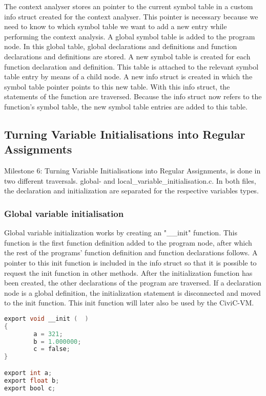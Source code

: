 \documentclass[hidelinks]{uva-inf-article}
\begin{document}
The context analyser stores an pointer to the current symbol table in a custom info struct created for the context analyser.
This pointer is necessary because we need to know to which symbol table we want to add a new entry while performing the context analysis.
A global symbol table is added to the program node.
In this global table, global declarations and definitions and function declarations and definitions are stored.
A new symbol table is created for each function declaration and definition. 
This table is attached to the relevant symbol table entry by means of a child node.
A new info struct is created in which the symbol table pointer points to this new table. 
With this info struct, the statements of the function are traversed. 
Because the info struct now refers to the function's symbol table, the new symbol table entries are added to this table.

\newpage
\subsection{Turning Variable Initialisations into Regular Assignments}
Milestone 6: Turning Variable Initialisations into Regular Assignments, is done in two different traversals.
global- and local\_variable\_initialisation.c. 
In both files, the declaration and initialization are separated for the respective variables types.

\subsubsection{Global variable initialisation}
Global variable initialization works by creating an "\_\_init" function. 
This function is the first function definition added to the program node, after which the rest of the programs' function definition and function declarations follows.
A pointer to this init function is included in the info struct so that it is possible to request the init function in other methods.
After the initialization function has been created, the other declarations of the program are traversed.
If a declaration node is a global definition, the initialization statement is disconnected and moved to the init function.
This init function will later also be used by the CiviC-VM.

\begin{lstlisting}[basicstyle=\small, language=C, label=lst:code-3, caption=Output of global variable initialisation, captionpos=b]
export void __init (  ) 
{
        a = 321;
        b = 1.000000;
        c = false;
}

export int a;
export float b;
export bool c;
\end{lstlisting}
\end{document}
